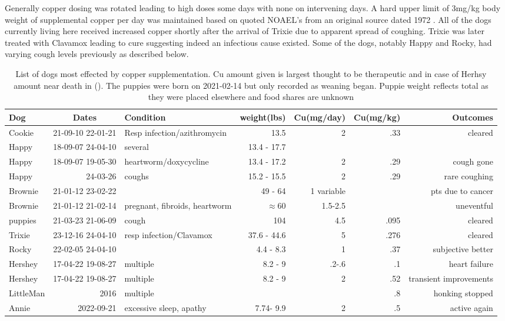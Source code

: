 \documentclass[aps,secnumarabic,balancelastpage,amsmath,amssymb,nofootinbib]{revtex4}
\begin{document}
Generally copper dosing was rotated leading to high doses
some days with none on intervening days. 
A hard upper limit of
3mg/kg body weight of supplemental copper per day was maintained  based 
on quoted NOAEL's from an  
original source dated  1972 \cite{NAP9782}.
All of the dogs currently living here received increased copper
shortly after the arrival of Trixie due to apparent
spread of coughing. Trixie was later treated with Clavamox
leading to cure suggesting indeed an infectious cause existed. 
Some of the dogs, notably Happy and Rocky, had varying cough levels
previously as described below. 



\begin{table}[H] \centering
\begin{tabular}{|l|r|l|r|r|r|r|}
\hline
Dog & \multicolumn{1}{|c|}{Dates} & Condition & weight(lbs) & Cu(mg/day)&Cu(mg/kg)& Outcomes \\
\hline
Cookie &21-09-10 22-01-21&Resp infection/azithromycin &13.5&2&.33&cleared \\
Happy  &18-09-07 24-04-10&several&13.4 - 17.7&&& \\
Happy  &18-09-07 19-05-30&heartworm/doxycycline&13.4 - 17.2&2&.29&cough gone \\
Happy  &24-03-26 &coughs&15.2 - 15.5&2&.29&rare coughing \\
Brownie  & 21-01-12 23-02-22& &49 - 64&1 variable&& pts due to cancer  \\
Brownie  & 21-01-12 21-02-14&pregnant, fibroids, heartworm & $\approx 60$ &1.5-2.5&& uneventful  \\
puppies  &21-03-23 21-06-09&cough&104&4.5&.095&cleared \\
Trixie  &23-12-16 24-04-10&resp infection/Clavamox&37.6 - 44.6&5&.276&cleared \\
Rocky  &22-02-05 24-04-10&&4.4 - 8.3 &1&.37&subjective better  \\
Hershey  &17-04-22 19-08-27&multiple&8.2 -  9 &.2-.6&.1& heart failure  \\
Hershey  &17-04-22 19-08-27&multiple&8.2 - 9 &2&.52& transient improvements  \\
LittleMan  &2016&multiple& &&.8 & honking stopped  \\
Annie  &2022-09-21 &excessive sleep, apathy &7.74- 9.9  &2 & .5 & active again  \\
\hline
\hline
\end{tabular}
\caption{List of dogs most effected by copper supplementation.
Cu amount given is largest thought to be therapeutic and in case
of Herhsy amount near death in ().
 The puppies were born on 2021-02-14 but only recorded as weaning began. Puppie weight reflects total as they were placed elsewhere and food shares are unknown   }
\label{tab:dogs}
\end{table}
\end{document}
